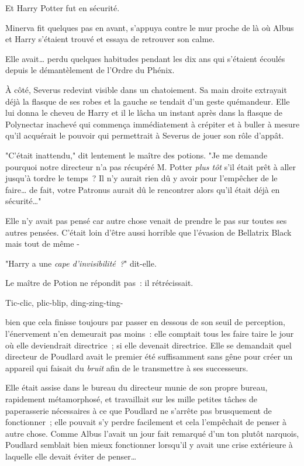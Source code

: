 Et Harry Potter fut en sécurité.

Minerva fit quelques pas en avant, s'appuya contre le mur proche de là où Albus et Harry s'étaient trouvé et essaya de retrouver son calme.

Elle avait… perdu quelques habitudes pendant les dix ans qui s'étaient écoulés depuis le démantèlement de l'Ordre du Phénix.

À côté, Severus redevint visible dans un chatoiement. Sa main droite extrayait déjà la flasque de ses robes et la gauche se tendait d'un geste quémandeur. Elle lui donna le cheveu de Harry et il le lâcha un instant après dans la flasque de Polynectar inachevé qui commença immédiatement à crépiter et à buller à mesure qu'il acquérait le pouvoir qui permettrait à Severus de jouer son rôle d'appât.

"C'était inattendu," dit lentement le maître des potions. "Je me demande pourquoi notre directeur n'a pas récupéré M. Potter \emph{plus tôt} s'il était prêt à aller jusqu'à tordre le temps~? Il n'y aurait rien dû y avoir pour l'empêcher de le faire… de fait, votre Patronus aurait dû le rencontrer alors qu'il était déjà en sécurité…"

Elle n'y avait pas pensé car autre chose venait de prendre le pas sur toutes ses autres pensées. C'était loin d'être aussi horrible que l'évasion de Bellatrix Black mais tout de même -

"Harry a une \emph{cape d'invisibilité~?}" dit-elle.

Le maître de Potion ne répondit pas~: il rétrécissait.

\later

Tic-clic, plic-blip, ding-zing-ting-

bien que cela finisse toujours par passer en dessous de son seuil de perception, l'énervement n'en demeurait pas moins~: elle comptait tous les faire taire le jour où elle deviendrait directrice~; si elle devenait directrice. Elle se demandait quel directeur de Poudlard avait le premier été suffisamment sans gêne pour créer un appareil qui faisait du \emph{bruit} afin de le transmettre à ses successeurs.

Elle était assise dans le bureau du directeur munie de son propre bureau, rapidement métamorphosé, et travaillait sur les mille petites tâches de paperasserie nécessaires à ce que Poudlard ne s'arrête pas brusquement de fonctionner~; elle pouvait s'y perdre facilement et cela l'empêchait de penser à autre chose. Comme Albus l'avait un jour fait remarqué d'un ton plutôt narquois, Poudlard semblait bien mieux fonctionner lorsqu'il y avait une crise extérieure à laquelle elle devait éviter de penser…

